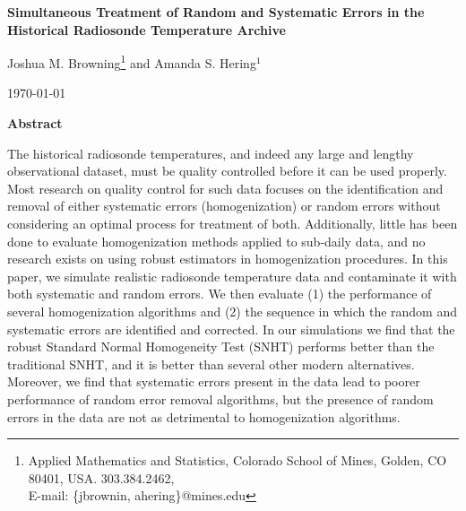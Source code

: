 \documentclass[12pt]{article}
\def\ni{\noindent}
\begin{document}
\thispagestyle{empty}
\baselineskip=28pt
\vskip 5mm
\begin{center} {\Large{\bf   Simultaneous Treatment of Random and Systematic Errors in the Historical Radiosonde Temperature Archive}}
\end{center}



\baselineskip=12pt
\vskip 5mm

\begin{center}\large
Joshua M. Browning\footnote{ \baselineskip=10pt
Applied Mathematics and Statistics, Colorado School of Mines, Golden, CO 80401,
USA. 303.384.2462, \\E-mail: \{jbrownin, ahering\}@mines.edu} and Amanda S. Hering$^1$




\end{center}

\baselineskip=17pt
\vskip 5mm
\centerline{\today}
\vskip 5mm

\begin{center}
{\large{\bf Abstract}}
\end{center}

\baselineskip=14pt

\ni  The historical radiosonde temperatures, and indeed any large and lengthy observational dataset, must be quality controlled before it can be  used properly.   Most research on quality control for such data focuses on the identification and removal of either systematic errors (homogenization) or random errors without considering an optimal process for treatment of both.  Additionally, little has been done to evaluate  homogenization methods applied to sub-daily data, and no research exists on using robust estimators in homogenization procedures.  In this paper, we simulate realistic radiosonde temperature data and contaminate it with both systematic and random errors.  We then evaluate (1) the performance of several homogenization algorithms and (2) the sequence in which the random and systematic errors are identified and corrected.  In our simulations we find that the robust Standard Normal Homogeneity Test (SNHT) performs better than the traditional SNHT, and it is better than several other modern alternatives.  Moreover, we find that systematic errors present in the data lead to poorer performance of random error removal algorithms, but the presence of random errors in the data are not as detrimental to homogenization algorithms.
\end{document}
